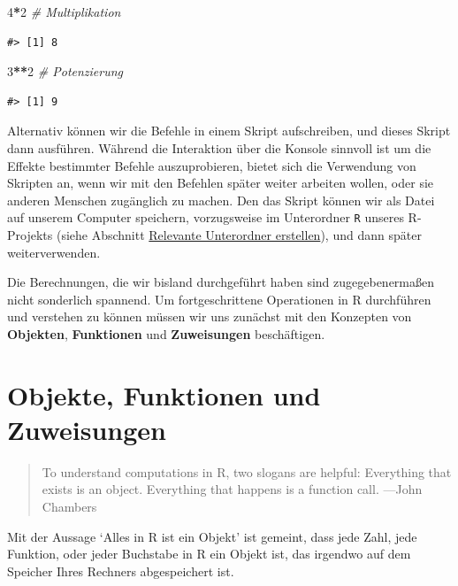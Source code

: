 \documentclass[]{book}
\newenvironment{Shaded}{\begin{snugshade}}{\end{snugshade}}
\newcommand{\DecValTok}[1]{\textcolor[rgb]{0.00,0.00,0.81}{#1}}
\newcommand{\CommentTok}[1]{\textcolor[rgb]{0.56,0.35,0.01}{\textit{#1}}}
\newcommand{\OperatorTok}[1]{\textcolor[rgb]{0.81,0.36,0.00}{\textbf{#1}}}
\begin{document}
\begin{Shaded}
\begin{Highlighting}[]
\DecValTok{4}\OperatorTok{*}\DecValTok{2} \CommentTok{# Multiplikation}
\end{Highlighting}
\end{Shaded}

\begin{verbatim}
#> [1] 8
\end{verbatim}

\begin{Shaded}
\begin{Highlighting}[]
\DecValTok{3}\OperatorTok{**}\DecValTok{2} \CommentTok{# Potenzierung}
\end{Highlighting}
\end{Shaded}

\begin{verbatim}
#> [1] 9
\end{verbatim}

Alternativ können wir die Befehle in einem Skript aufschreiben, und
dieses Skript dann ausführen. Während die Interaktion über die Konsole
sinnvoll ist um die Effekte bestimmter Befehle auszuprobieren, bietet
sich die Verwendung von Skripten an, wenn wir mit den Befehlen später
weiter arbeiten wollen, oder sie anderen Menschen zugänglich zu machen.
Den das Skript können wir als Datei auf unserem Computer speichern,
vorzugsweise im Unterordner \texttt{R} unseres R-Projekts (siehe
Abschnitt \protect\hyperlink{unterordner}{Relevante Unterordner
erstellen}), und dann später weiterverwenden.

Die Berechnungen, die wir bisland durchgeführt haben sind
zugegebenermaßen nicht sonderlich spannend. Um fortgeschrittene
Operationen in R durchführen und verstehen zu können müssen wir uns
zunächst mit den Konzepten von \textbf{Objekten}, \textbf{Funktionen}
und \textbf{Zuweisungen} beschäftigen.

\section{Objekte, Funktionen und
Zuweisungen}\label{objekte-funktionen-und-zuweisungen}

\begin{quote}
To understand computations in R, two slogans are helpful: Everything
that exists is an object. Everything that happens is a function call.
---John Chambers
\end{quote}

Mit der Aussage `Alles in R ist ein Objekt' ist gemeint, dass jede Zahl,
jede Funktion, oder jeder Buchstabe in R ein Objekt ist, das irgendwo
auf dem Speicher Ihres Rechners abgespeichert ist.
\end{document}
